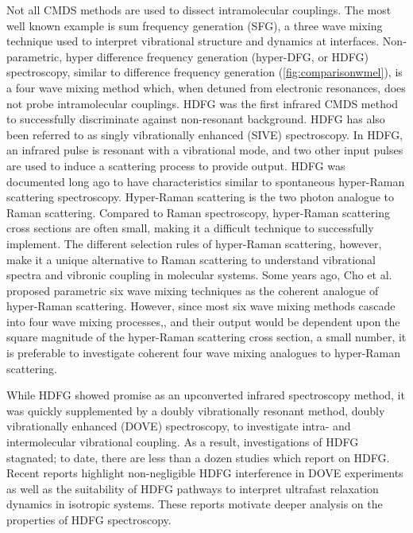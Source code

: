 \documentclass[aip, jcp, reprint, twocolumn]{revtex4-2}
\begin{document}
Not all CMDS methods are used to dissect intramolecular couplings.\cite{Shen1987_CPL}
The most well known example is sum frequency generation (SFG), a three wave mixing technique used to interpret vibrational structure and dynamics at interfaces. \cite{RN431, Piontek2023}
Non-parametric, hyper difference frequency generation (hyper-DFG, or HDFG) spectroscopy, similar to difference frequency generation (\autoref{fig:comparisonwmel}), is a four wave mixing method which, when detuned from  electronic resonances, does not probe intramolecular couplings. 
HDFG was the first infrared CMDS method to successfully discriminate against non-resonant background.\cite{RN351, RN352}
HDFG has also been referred to as singly vibrationally enhanced (SIVE) spectroscopy. \cite{RN351}
In HDFG, an infrared pulse is resonant with a vibrational mode, and two other input pulses are used to induce a scattering process to provide output.
HDFG was documented long ago to have characteristics similar to spontaneous hyper-Raman scattering spectroscopy. \cite{RN352}
Hyper-Raman scattering is the two photon analogue to Raman scattering. \cite{Cyvin1965, Terhune1965, Kozich2007}
Compared to Raman spectroscopy, hyper-Raman scattering cross sections are often small, making it a difficult technique to successfully implement.\cite{RN515, Kelley2010} 
The different selection rules of hyper-Raman scattering, however, make it a unique alternative to Raman scattering to understand vibrational spectra and vibronic coupling in molecular systems.
Some years ago, Cho et al. proposed parametric six wave mixing techniques as the coherent analogue of hyper-Raman scattering. \cite{Cho1997, Cho1998}
However, since most six wave mixing methods cascade into four wave mixing processes,\cite{RN243, RN302, Cho2000_Cascade}, and their output would be dependent upon the square magnitude of the hyper-Raman scattering cross section, a small number,\cite{RN515} it is preferable to investigate coherent four wave mixing analogues to hyper-Raman scattering.

While HDFG showed promise as an upconverted infrared spectroscopy method, it was quickly supplemented by a doubly vibrationally resonant method, doubly vibrationally enhanced (DOVE) spectroscopy, to investigate intra- and intermolecular vibrational coupling. \cite{RN345, RN101, Cho2000}
As a result, investigations of HDFG stagnated; to date, there are less than a dozen studies which report on HDFG. \cite{RN350, RN416, RN351, RN352, RN353, Chen1998, RN362, RN418, Bonn2024, McDonnell2024}
Recent reports highlight non-negligible HDFG interference in DOVE experiments as well as the suitability of HDFG pathways to interpret ultrafast relaxation dynamics in isotropic systems. \cite{Bonn2024, McDonnell2024}
These reports motivate deeper analysis on the properties of HDFG spectroscopy. 
\end{document}
